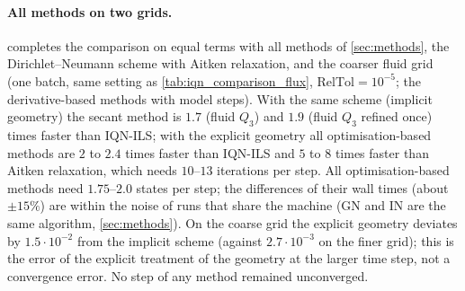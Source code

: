 \documentclass[11pt,a4paper]{article}
\theoremstyle{definition}
\theoremstyle{remark}
\begin{document}
\paragraph{All methods on two grids.}  completes the comparison on equal
terms with all methods of \cref{sec:methods}, the Dirichlet--Neumann scheme with Aitken relaxation,
and the coarser fluid grid (one batch, same setting as \cref{tab:iqn_comparison_flux},
$\mathrm{RelTol}=10^{-5}$; the derivative-based methods with model steps). With the same scheme
(implicit geometry) the secant method is $1.7$ (fluid $Q_3$) and $1.9$ (fluid $Q_3$ refined once)
times faster than IQN-ILS; with the explicit geometry all optimisation-based methods are $2$ to
$2.4$ times faster than IQN-ILS and $5$ to $8$ times faster than Aitken relaxation, which needs
$10$--$13$ iterations per step. All optimisation-based methods need $1.75$--$2.0$ states per step;
the differences of their wall times (about $\pm15\%$) are within the noise of runs that share the
machine (GN and IN are the same algorithm, \cref{sec:methods}). On the coarse grid the explicit
geometry deviates by $1.5\cdot10^{-2}$ from the implicit scheme (against $2.7\cdot10^{-3}$ on the
finer grid); this is the error of the explicit treatment of the geometry at the larger time step,
not a convergence error. No step of any method remained unconverged.
\end{document}
